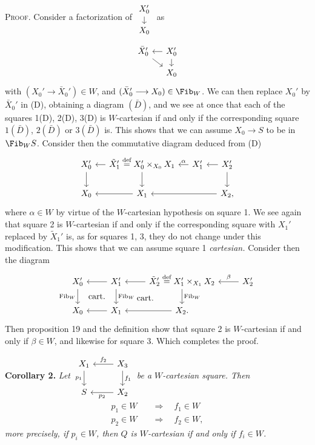 \textsc{Proof}. Consider a factorization of $\begin{tikzcd}[ampersand replacement=\&, row sep=small] X_0' \arrow[d] \\ X_0 \end{tikzcd}$ as
\[
\begin{tikzcd}[ampersand replacement=\&, column sep=small, row sep=small]
\bar{X}_0' \arrow[dr] \& X_0' \arrow[l] \arrow[d] \\
\& X_0
\end{tikzcd}
\]
with $(X_0'\longrightarrow\bar{X}_0')\in W$, and $(\bar{X}_0'\longrightarrow X_0)\in\Fib_W$. We can then replace $X_0'$ by $\bar{X}_0'$ in (D), obtaining a diagram $(\bar{D})$, and we see at once
that each of the squares 1(D), 2(D), 3(D) is $W$-cartesian if and only if the corresponding square $1(\bar{D})$, $2(\bar{D})$ or $3(\bar{D})$ is. This shows that we can assume $X_0\longrightarrow S$ to be in $\Fib_W S$. Consider then the commutative diagram deduced from (D)
\[
\begin{tikzcd}[ampersand replacement=\&, column sep=small]
X_0' \arrow[d] \& \tilde{X}_1'\overset{\text{def}}{=}X_0'\times_{X_0}X_1 \arrow[l] \arrow[d] \& X_1' \arrow[l, "\alpha"'] \& X_2' \arrow[l] \arrow[d] \\
X_0 \& X_1 \arrow[l] \& \& X_2, \arrow[ll]
\end{tikzcd}
\]
where $\alpha\in W$ by virtue of the $W$-cartesian hypothesis on square 1. We see again that square 2 is $W$-cartesian if and only if the corresponding square with $X_1'$ replaced by $\tilde{X}_1'$ is, as for squares 1, 3, they do not change under this modification. This shows that we can assume square 1 \textit{cartesian.} Consider then the diagram
\[
\begin{tikzcd}[ampersand replacement=\&]
X_0' \arrow[d, "\mathrm{Fib}_W"'] \& X_1' \arrow[l] \arrow[d, "\mathrm{Fib}_W"] \arrow[dl, phantom, "\text{cart.}"] \& \tilde{X}_2'\overset{\text{def}}{=}X_1'\times_{X_1}X_2 \arrow[l] \arrow[d, "\mathrm{Fib}_W"] \arrow[dl, phantom, "\text{cart.}"] \& X_2' \arrow[l, "\beta"'] \\
X_0 \& X_1 \arrow[l] \& X_2. \arrow[l]
\end{tikzcd}
\]
Then proposition 19 and the definition show that square 2 is $W$-cartesian if and only if $\beta\in W$, and likewise for square 3. Which completes the proof. %

\textbf{Corollary 2.} \textit{Let $\begin{tikzcd}[ampersand replacement=\&] X_1 \arrow[d, "p_1"'] \& X_3 \arrow[l, "f_2"'] \arrow[d, "f_1"] \\ S \& X_2 \arrow[l, "p_2"] \end{tikzcd}$ be a $W$-cartesian square. Then}
\[
\begin{aligned}
p_1\in W\quad&\Longrightarrow\quad f_1\in W\\
p_2\in W\quad&\Longrightarrow\quad f_2\in W,
\end{aligned}
\]
\textit{more precisely, if $p_i\in W$, then $Q$ is $W$-cartesian if and only if $f_i\in W$.}

